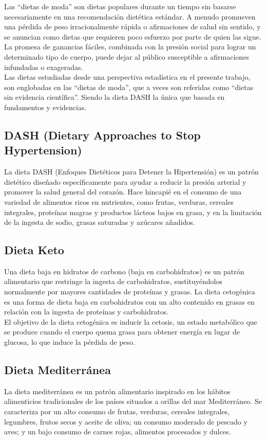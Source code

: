 \documentclass[12pt,a4paper]{article}
\begin{document}
Las ``dietas de moda'' son dietas populares durante un tiempo sin basarse 
necesariamente en una recomendación dietética estándar. A menudo promueven 
una pérdida de peso irracionalmente rápida o afirmaciones de salud sin 
sentido, y se anuncian como dietas que requieren poco esfuerzo por parte de 
quien las sigue. La promesa de ganancias fáciles, combinada con la presión 
social para lograr un determinado tipo de cuerpo, puede dejar al público 
susceptible a afirmaciones infundadas o exageradas.\cite{marvastipopular} \\

Las dietas estudiadas desde una perspectiva estadística en el presente 
trabajo, son englobadas en las ``dietas de moda'', que a veces son referidas 
como ``dietas sin evidencia científica''. Siendo  la dieta DASH la única 
que basada en fundamentos y evidencias.

\subsection{DASH (Dietary Approaches to Stop Hypertension)}
\cite{marvastipopular} La dieta DASH (Enfoques Dietéticos para Detener la 
Hipertensión) es un patrón dietético diseñado específicamente para ayudar 
a reducir la presión arterial y promover la salud general del corazón. Hace 
hincapié en el consumo de una variedad de alimentos ricos en nutrientes, 
como frutas, verduras, cereales integrales, proteínas magras y productos 
lácteos bajos en grasa, y en la limitación de la ingesta de sodio, grasas 
saturadas y azúcares añadidos. 

\subsection{Dieta Keto}
\cite{marvastipopular} Una dieta baja en hidratos de carbono (baja en 
carbohidratos) es un patrón alimentario que restringe la ingesta de 
carbohidratos, sustituyéndolos normalmente por mayores cantidades de 
proteínas y grasas. La dieta cetogénica es una forma de dieta baja en 
carbohidratos con un alto contenido en grasas en relación con la ingesta 
de proteínas y carbohidratos.\\

El objetivo de la dieta cetogénica es inducir la cetosis, un estado 
metabólico que se produce cuando el cuerpo quema grasa para obtener 
energía en lugar de glucosa, lo que induce la pérdida de peso.

\subsection{Dieta Mediterránea}
\cite{marvastipopular} La dieta mediterránea es un patrón alimentario 
inspirado en los hábitos alimenticios tradicionales de los países 
situados a orillas del mar Mediterráneo. Se caracteriza por un alto consumo 
de frutas, verduras, cereales integrales, legumbres, frutos secos y 
aceite de oliva; un consumo moderado de pescado y aves; y un bajo 
consumo de carnes rojas, alimentos procesados y dulces.\\
\end{document}
